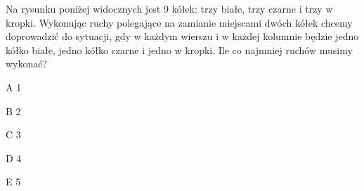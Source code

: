\begin{tresc}
Na rysunku poniżej widocznych jest 9 kółek: trzy białe, trzy czarne i trzy w kropki. Wykonując ruchy polegające na zamianie miejscami dwóch kółek chcemy doprowadzić do sytuacji, gdy w każdym wierszu i w każdej kolumnie będzie jedno kółko białe, jedno kółko czarne i jedno w kropki. Ile co najmniej ruchów musimy wykonać?
\end{tresc}
\begin{wariant}{A} 1 \end{wariant}
\begin{wariant}{B} 2 \end{wariant}
\begin{wariant}{C} 3 \end{wariant}
\begin{wariant}{D} 4 \end{wariant}
\begin{wariant}{E} 5 \end{wariant}
